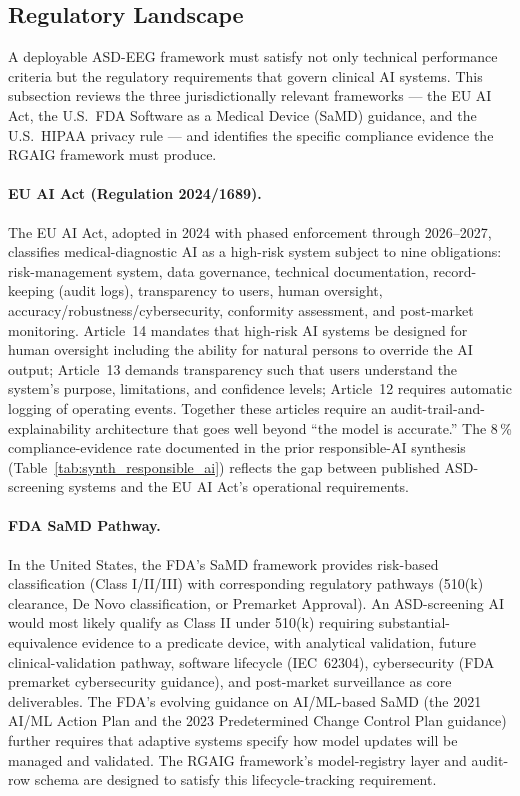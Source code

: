 \subsection{Regulatory Landscape}
\label{subsec:regulatory_landscape}

A deployable ASD-EEG framework must satisfy not only technical performance criteria but the regulatory requirements that govern clinical AI systems. This subsection reviews the three jurisdictionally relevant frameworks --- the EU AI Act, the U.S.\ FDA Software as a Medical Device (SaMD) guidance, and the U.S.\ HIPAA privacy rule --- and identifies the specific compliance evidence the RGAIG framework must produce.

\paragraph{EU AI Act (Regulation 2024/1689).}
The EU AI Act, adopted in 2024 with phased enforcement through 2026--2027, classifies medical-diagnostic AI as a high-risk system subject to nine obligations: risk-management system, data governance, technical documentation, record-keeping (audit logs), transparency to users, human oversight, accuracy/robustness/cybersecurity, conformity assessment, and post-market monitoring. Article~14 mandates that high-risk AI systems be designed for human oversight including the ability for natural persons to override the AI output; Article~13 demands transparency such that users understand the system's purpose, limitations, and confidence levels; Article~12 requires automatic logging of operating events. Together these articles require an audit-trail-and-explainability architecture that goes well beyond ``the model is accurate.'' The 8\,\% compliance-evidence rate documented in the prior responsible-AI synthesis (Table~\ref{tab:synth_responsible_ai}) reflects the gap between published ASD-screening systems and the EU AI Act's operational requirements.

\paragraph{FDA SaMD Pathway.}
In the United States, the FDA's SaMD framework provides risk-based classification (Class I/II/III) with corresponding regulatory pathways (510(k) clearance, De Novo classification, or Premarket Approval). An ASD-screening AI would most likely qualify as Class II under 510(k) requiring substantial-equivalence evidence to a predicate device, with analytical validation, future clinical-validation pathway, software lifecycle (IEC~62304), cybersecurity (FDA premarket cybersecurity guidance), and post-market surveillance as core deliverables. The FDA's evolving guidance on AI/ML-based SaMD (the 2021 AI/ML Action Plan and the 2023 Predetermined Change Control Plan guidance) further requires that adaptive systems specify how model updates will be managed and validated. The RGAIG framework's model-registry layer and audit-row schema are designed to satisfy this lifecycle-tracking requirement.

